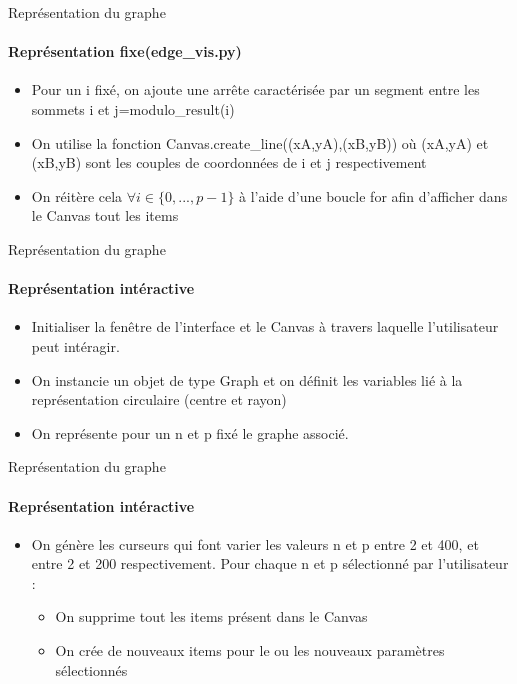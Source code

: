 \documentclass{beamer}
\begin{document}
\begin{frame}{Représentation du graphe}
\framesubtitle{Représentation fixe(edge\_vis.py)}
\begin{itemize}
\item Pour un i fixé, on ajoute une arrête caractérisée par un segment entre les sommets i et j=modulo\_result(i) 
\item On utilise la fonction Canvas.create\_line((xA,yA),(xB,yB)) où (xA,yA) et (xB,yB) sont les couples de coordonnées de i et j respectivement
\item On réitère cela $\forall i \in \{0,...,p-1\}$ à l'aide d'une boucle for afin d'afficher dans le Canvas tout les items
\end{itemize} 
\end{frame}

\begin{frame}{Représentation du graphe}
\framesubtitle{Représentation intéractive}
\begin{itemize} 
\item Initialiser la fenêtre de l’interface et le Canvas à travers laquelle l'utilisateur peut intéragir. 
\item On instancie un objet de type Graph et on définit les variables lié à la représentation circulaire (centre et rayon)
\item On représente pour un n et p fixé le graphe associé.
\end{itemize}
\end{frame}

\begin{frame}{Représentation du graphe}
\framesubtitle{Représentation intéractive}
\begin{itemize} 
\item On génère les curseurs qui font varier les valeurs n et p entre 2 et 400, et entre 2 et 200 respectivement. Pour chaque n et p sélectionné par l'utilisateur :
\begin{itemize}
\item On supprime tout les items présent dans le Canvas
\item On crée de nouveaux items pour le ou les nouveaux paramètres sélectionnés
\end{itemize}
\end{itemize}
\end{frame}
\end{document}
